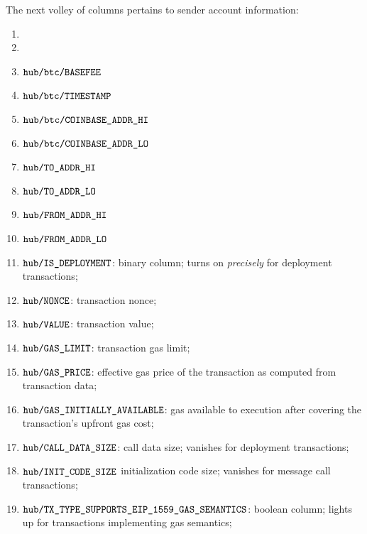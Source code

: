 The next volley of columns pertains to sender account information:
\begin{enumerate}
	\item
		\markAsExtractedFromBtc{}
		\txnDataHubBlockNumber{}
	\item
		\markAsExtractedFromBtc{}
		\txnDataHubBlockGasLimit{}
	\item
		\markAsExtractedFromBtc{}
		$\texttt{hub}\texttt{/}{\texttt{\texttt{btc}\texttt{/}{\texttt{\texttt{BASEFEE}}}}}$
	\item
		\markAsExtractedFromBtc{}
		$\texttt{hub}\texttt{/}{\texttt{\texttt{btc}\texttt{/}{\texttt{\texttt{TIMESTAMP}}}}}$
	\item
		\markAsExtractedFromBtc{}
		$\texttt{hub}\texttt{/}{\texttt{\texttt{btc}\texttt{/}{\texttt{\texttt{COINBASE\_ADDR\_HI}}}}}$
	\item
		\markAsExtractedFromBtc{}
		$\texttt{hub}\texttt{/}{\texttt{\texttt{btc}\texttt{/}{\texttt{\texttt{COINBASE\_ADDR\_LO}}}}}$
	\item
		\markAsExtractedFromRlpTxn{}
		\markAsExtractedFromRlpAddr{}
		$\texttt{hub}\texttt{/}{\texttt{\texttt{TO\_ADDR\_HI}}}$
	\item
		\markAsExtractedFromRlpTxn{}
		\markAsExtractedFromRlpAddr{}
		$\texttt{hub}\texttt{/}{\texttt{\texttt{TO\_ADDR\_LO}}}$
	\item
		\markAsObtainedViaEcrecover{}
		$\texttt{hub}\texttt{/}{\texttt{\texttt{FROM\_ADDR\_HI}}}$
	\item
		\markAsObtainedViaEcrecover{}
		$\texttt{hub}\texttt{/}{\texttt{\texttt{FROM\_ADDR\_LO}}}$
	\item
		\markAsExtractedFromRlpTxn{}
		$\texttt{hub}\texttt{/}{\texttt{\texttt{IS\_DEPLOYMENT}}}$:
		binary column;
		turns on \emph{precisely} for deployment transactions;
	\item
		\markAsExtractedFromRlpTxn{}
		$\texttt{hub}\texttt{/}{\texttt{\texttt{NONCE}}}$:
		transaction nonce;
	\item
		\markAsExtractedFromRlpTxn{}
		$\texttt{hub}\texttt{/}{\texttt{\texttt{VALUE}}}$:
		transaction value;
	\item
		\markAsExtractedFromRlpTxn{}
		$\texttt{hub}\texttt{/}{\texttt{\texttt{GAS\_LIMIT}}}$:
		transaction gas limit;
	\item
		\markAsJustifiedHere{}
		$\texttt{hub}\texttt{/}{\texttt{\texttt{GAS\_PRICE}}}$:
		effective gas price of the transaction as computed from transaction data;
	\item
		\markAsJustifiedHere{}
		$\texttt{hub}\texttt{/}{\texttt{\texttt{GAS\_INITIALLY\_AVAILABLE}}}$:
		gas available to \evm{} execution after covering the transaction's upfront gas cost;
	\item
		\markAsJustifiedHere{}
		$\texttt{hub}\texttt{/}{\texttt{\texttt{CALL\_DATA\_SIZE}}}$:
		call data size;
		vanishes for deployment transactions;
	\item
		\markAsJustifiedHere{}
		$\texttt{hub}\texttt{/}{\texttt{\texttt{INIT\_CODE\_SIZE}}}$
		initialization code size;
		vanishes for message call transactions;
	\item
		\markAsJustifiedHere{}
		$\texttt{hub}\texttt{/}{\texttt{\texttt{TX\_TYPE\_SUPPORTS\_EIP\_1559\_GAS\_SEMANTICS}}}$:
		boolean column;
		lights up for transactions implementing \cite{EIP-1559} gas semantics;

\end{enumerate}
